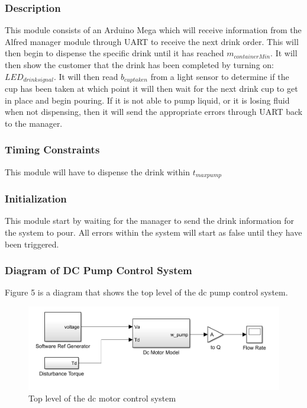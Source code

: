\documentclass [10pt]{article}
\begin{document}

\subsubsection{Description}
This module consists of an Arduino Mega which will receive information from the Alfred manager module through UART to receive the next drink order. This will then begin to dispense the specific drink until it has reached $ m_{containerMin} $. It will then show the customer that the drink has been completed by turning on: $ LED_{drinksignal} $. It will then read $ b_{cuptaken} $ from a light sensor to determine if the cup has been taken at which point it will then wait for the next drink cup to get in place and begin pouring. If it is not able to pump liquid, or it is losing fluid when not dispensing, then it will send the appropriate errors through UART back to the manager.


\subsubsection{Timing Constraints}
This module will have to dispense the drink within $ t_{maxpump} $


\subsubsection{Initialization}
This module start by waiting for the manager to send the drink information for the system to pour. All errors within the system will start as false until they have been triggered.



\subsubsection{Diagram of DC Pump Control System}
Figure 5 is a diagram that shows the top level of the dc pump control system. 
\begin{figure} [h!]
	\centering
	\includegraphics [scale = 0.6] {Figures/DC_PumpSim.png}
	\caption{Top level of the dc motor control system}
\end{figure}
\end{document}

